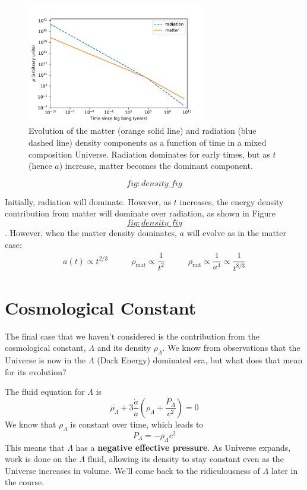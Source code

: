 \documentclass[]{book}
\begin{document}
\begin{figure}
\centering
\includegraphics[width=0.70000\textwidth]{Images/density_plot.pdf}
\caption{Evolution of the matter (orange solid line) and radiation (blue
dashed line) density components as a function of time in a mixed
composition Universe. Radiation dominates for early times, but as \(t\)
(hence \(a\)) increase, matter becomes the dominant component.}
\end{figure}

\protect\hypertarget{fig:density_fig}{}{\[fig:density\_fig\]}

Initially, radiation will dominate. However, as \(t\) increases, the
energy density contribution from matter will dominate over radiation, as
shown in
Figure~\protect\hyperlink{fig:density_fig}{\[fig:density\_fig\]}.
However, when the matter density dominates, \(a\) will evolve as in the
matter case: \[\begin{array}{lcr}
    a(t) \propto t^{2/3} & \qquad
    \rho_{\text{mat}} \propto \dfrac{1}{t^2} & \qquad
    \rho_{\text{rad}} \propto \dfrac{1}{a^4} \propto \dfrac{1}{t^{8/3}}
\end{array}\]

\section{Cosmological Constant}\label{sec:dark_energy_1}

The final case that we haven't considered is the contribution from the
cosmological constant, \(\Lambda\) and its density \(\rho_{\Lambda}\).
We know from observations that the Universe is now in the \(\Lambda\)
(Dark Energy) dominated era, but what does that mean for its evolution?

The fluid equation for \(\Lambda\) is
\[\dot{\rho_{\Lambda}} + 3\frac{\dot{a}}{a} \left(\rho_{\Lambda} + \dfrac{P_{\Lambda}}{c^2}\right) = 0\]
We know that \(\rho_{\Lambda}\) is constant over time, which leads to
\[P_\Lambda = -\rho_{\Lambda}c^2\] This means that \(\Lambda\) has a
\textbf{negative effective pressure}. As Universe expands, work is done
on the \(\Lambda\) fluid, allowing its density to stay constant even as
the Universe increases in volume. We'll come back to the ridiculousness
of \(\Lambda\) later in the course.
\end{document}
